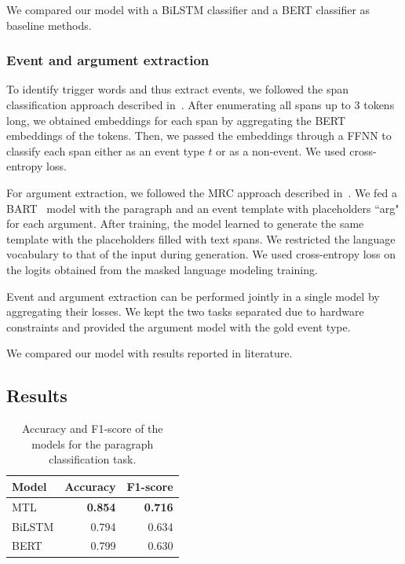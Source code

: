 \documentclass[runningheads]{llncs}
\begin{document}
We compared our model with a BiLSTM classifier and a BERT classifier as baseline methods.

\subsubsection{Event and argument extraction} To identify trigger words and thus extract events, we followed the span classification approach described in~\cite{zhong-chen-2021-frustratingly}. After enumerating all spans up to 3 tokens long, we obtained embeddings for each span by aggregating the BERT embeddings of the tokens. Then, we passed the embeddings through a FFNN to classify each span either as an event type $t$ or as a non-event. We used cross-entropy loss.

For argument extraction, we followed the MRC approach described in~\cite{li-etal-2021-genarg,wen-etal-2021-resin}. We fed a BART~\cite{lewis-etal-2020-bart} model with the paragraph and an event template with placeholders “\textlangle{}arg\textrangle{}" for each argument. After training, the model learned to generate the same template with the placeholders filled with text spans. We restricted the language vocabulary to that of the input during generation. We used cross-entropy loss on the logits obtained from the masked language modeling training. 

Event and argument extraction can be performed jointly in a single model by aggregating their losses. We kept the two tasks separated due to hardware constraints and provided the argument model with the gold event type.

We compared our model with results reported in literature.

\subsection{Results}

\begin{table}
    \caption{Accuracy and F1-score of the models for the paragraph classification task.}
    \label{tab:historical_events:classification}
    \centering
    \begin{tabular}{lrr}
        \toprule
        Model & Accuracy & F1-score\\
        \midrule
        MTL & \textbf{0.854} & \textbf{0.716} \\
        BiLSTM & 0.794 & 0.634 \\
        BERT & 0.799 & 0.630 \\
        \bottomrule
    \end{tabular}
\end{table}
\end{document}
